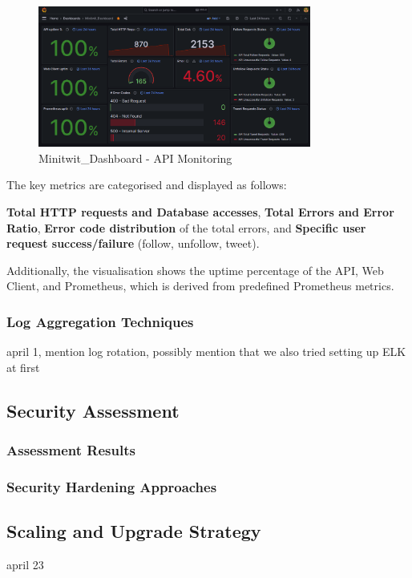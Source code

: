 \begin{figure}[H]
    \centering
    \includegraphics[width=0.8\textwidth]{images/monitor_good.png}
    \caption{Minitwit\_Dashboard - API Monitoring}
    \label{fig:monitor_good}
\end{figure}
The key metrics are categorised and displayed as follows:

\textbf{Total HTTP requests and Database accesses}, \textbf{Total Errors and Error Ratio}, \textbf{Error code distribution} of the total errors, and \textbf{Specific user request success/failure} (follow, unfollow, tweet). 

Additionally, the visualisation shows the uptime percentage of the API, Web Client, and Prometheus, which is derived from predefined Prometheus metrics.

\subsubsection*{Log Aggregation Techniques}
april 1, mention log rotation, possibly mention that we also tried setting up ELK at first
\subsection{Security Assessment}
\subsubsection*{Assessment Results}
\subsubsection*{Security Hardening Approaches}
\subsection{Scaling and Upgrade Strategy}
april 23
